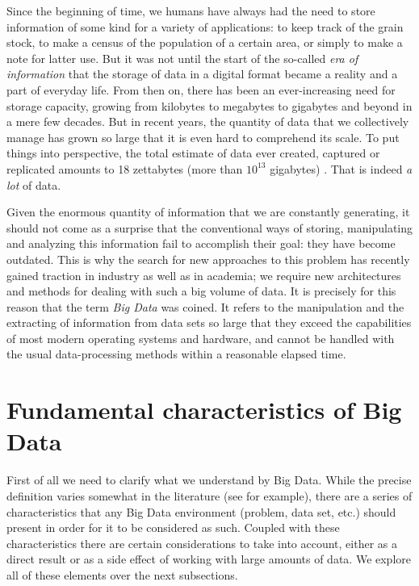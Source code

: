 %
%
%

Since the beginning of time, we humans have always had the need to store information of some kind for a variety of applications: to keep track of the grain stock, to make a census of the population of a certain area, or simply to make a note for latter use. But it was not until the start of the so-called \textit{era of information} that the storage of data in a digital format became a reality and a part of everyday life. From then on, there has been an ever-increasing need for storage capacity, growing from kilobytes to megabytes to gigabytes and beyond in a mere few decades. But in recent years, the quantity of data that we collectively manage has grown so large that it is even hard to comprehend its scale. To put things into perspective, the total estimate of data ever created, captured or replicated amounts to 18 zettabytes (more than $10^{13}$ gigabytes) \cite{rydning2018digitization}. That is indeed \textit{a lot} of data.

Given the enormous quantity of information that we are constantly generating, it should not come as a surprise that the conventional ways of storing, manipulating and analyzing this information fail to accomplish their goal: they have become outdated. This is why the search for new approaches to this problem has recently gained traction in industry as well as in academia; we require new architectures and methods for dealing with such a big volume of data. It is precisely for this reason that the term \textit{Big Data} was coined. It refers to the manipulation and the extracting of information from data sets so large that they exceed the capabilities of most modern operating systems and hardware, and cannot be handled with the usual data-processing methods within a reasonable elapsed time.

\section{Fundamental characteristics of Big Data}

First of all we need to clarify what we understand by Big Data. While the precise definition varies somewhat in the literature (see \cite{kitchin2016big} for example), there are a series of characteristics that any Big Data environment (problem, data set, etc.) should present in order for it to be considered as such. Coupled with these characteristics there are certain considerations to take into account, either as a direct result or as a side effect of working with large amounts of data. We explore all of these elements over the next subsections.

